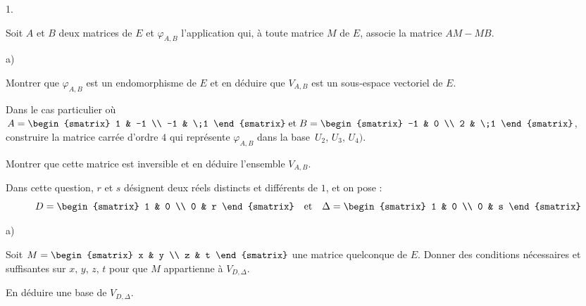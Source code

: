\documentclass[11pt]{article}%
\begin{document}
\begin{noliste}{1.}
 \setlength{\itemsep}{4mm}
\item Soit $A$ et $B$ deux matrices de $E$ et $\varphi_{A,B}$
l'application
qui, à toute matrice $M$ de $E$, associe \hfill\break la matrice
$AM-MB$.

\begin{noliste}{a)}
 \setlength{\itemsep}{2mm}
\item Montrer que $\varphi_{A,B}$ est un endomorphisme de $E$ et en
déduire que $V_{A,B}$ est un sous-espace vectoriel de $E$.

\item Dans le cas particulier où $ A = 
\begin{smatrix}
1 & -1 \\
-1 & \;1
\end{smatrix}
\;\text{et}\;B = 
\begin{smatrix}
-1 & 0 \\
2 & \;1
\end{smatrix}
$, construire la matrice carrée d'ordre $4$ qui représente $\varphi
_{A,B}$ dans la base $\,U_{2},\,U_{3},\,U_{4})$.

Montrer que cette matrice est inversible et en déduire l'ensemble
$V_{A,B}$.
\end{noliste}

\item \label{d} Dans cette question, $r$ et $s$ désignent deux réels
distincts et différents de $1$, et on pose : 
\[
D = 
\begin{smatrix}
1 & 0 \\
0 & r
\end{smatrix}
\quad \text{et}\quad \Delta = 
\begin{smatrix}
1 & 0 \\
0 & s
\end{smatrix}
\]

\begin{noliste}{a)}
 \setlength{\itemsep}{2mm}
\item Soit $ M = 
\begin{smatrix}
x & y \\
z & t
\end{smatrix}
$ une matrice quelconque de $E$. Donner des conditions nécessaires et
suffisantes sur $x,\,y,\,z,\,t$ pour que $M$ appartienne à $V_{D,\Delta
} $.

\item En déduire une base de $V_{D,\Delta}$.
\end{noliste}


\end{noliste}
\end{document}
